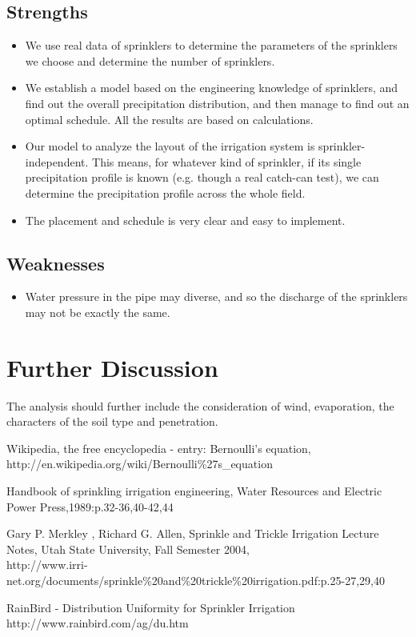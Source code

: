 \documentclass[12pt,a4paper,titlepage]{article}
\begin{document}
\subsection{Strengths}
\begin{itemize}
\item We use real data of sprinklers to determine the parameters of the sprinklers we choose and determine the number of sprinklers.

\item We establish a model based on the engineering knowledge of sprinklers, and find out the overall precipitation distribution, and then manage to find out an optimal schedule. All the results are based on calculations.

\item Our model to analyze the layout of the irrigation system is sprinkler-independent. This means, for whatever kind of sprinkler, if its single precipitation profile is known (e.g. though a real catch-can test), we can determine the precipitation profile across the whole field.

\item The placement and schedule is very clear and easy to implement.
\end{itemize}

\subsection{Weaknesses}
\begin{itemize}
\item Water pressure in the pipe may diverse, and so the discharge of the sprinklers may not be exactly the same.
\end{itemize}

\section{Further Discussion}

The analysis should further include the consideration of wind,
evaporation, the characters of the soil type and penetration.

\newpage
\begin{thebibliography}{1}
Wikipedia, the free encyclopedia - entry: Bernoulli's equation,
http://en.wikipedia.org/wiki/Bernoulli\%27s\_equation

Handbook of sprinkling irrigation engineering, Water Resources
and Electric Power Press,1989:p.32-36,40-42,44

Gary P. Merkley , Richard G. Allen, Sprinkle and Trickle
Irrigation Lecture Notes, Utah State University, Fall Semester
2004,
\\http://www.irri-net.org/documents/sprinkle\%20and\%20trickle\%20irrigation.pdf:p.25-27,29,40

RainBird - Distribution Uniformity for Sprinkler Irrigation
\\http://www.rainbird.com/ag/du.htm
\end{thebibliography}
\end{document}
